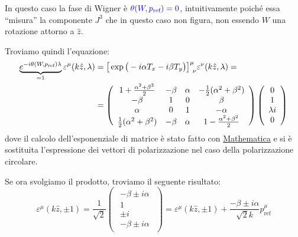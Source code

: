\documentclass[../main.tex]{subfiles}
\begin{document}
\begin{enumerate}
    In questo caso la fase di Wigner è $\textcolor{blue}{\theta (W, p_\text{ref})=0}$, intuitivamente poiché essa “misura” la componente $J^3$ che in questo caso non figura, non essendo $W$ una rotazione attorno a $\hat{z}$.

    Troviamo quindi l'equazione:
    \begin{align*}
        \underbrace{e^{-i\theta(W, p_\text{ref})\lambda}}_{\textcolor{blue}{=1}}\varepsilon^\mu(k\hat{z}, \lambda) &= \big[ \exp\big( -i\alpha T_x -i\beta T_y \big)\big]^{\mu}_{~\nu}\varepsilon^\nu(k\hat{z}, \lambda) =\\
        &=\begin{pmatrix}
            \begin{array}{cccc}
               1+\frac{\alpha^2+\beta^2}{2}  & -\beta  & \alpha  & -\frac{1}{2}(\alpha^2+\beta^2) \\
               -\beta  &  1  &  0  & \beta \\
               \alpha  &  0  &  1  & -\alpha \\
                \frac{1}{2}(\alpha^2+\beta^2) & -\beta & \alpha  &  1-\frac{\alpha^2+\beta^2}{2}
            \end{array}
        \end{pmatrix}
        \begin{pmatrix}
            \begin{array}{c}
                0 \\
                1 \\
                \lambda i\\
                0
            \end{array}
        \end{pmatrix}
    \end{align*}
    dove il calcolo dell'esponenziale di matrice è stato fatto con \href{https://www.wolfram.com/mathematica/}{Mathematica} e si è sostituita l'espressione dei vettori di polarizzazione nel caso della polarizzazione circolare.

    Se ora svolgiamo il prodotto, troviamo il seguente risultato:
    \begin{equation}
        \boxed{\varepsilon^\mu(k\hat{z}, \pm 1) = \frac{1}{\sqrt{2}}
        \begin{pmatrix}
            \begin{array}{c}
                -\beta\pm i\alpha \\
                1 \\
                \pm i\\
                -\beta\pm i\alpha
            \end{array}
        \end{pmatrix} = \varepsilon^\mu(k\hat{z}, \pm 1) + \frac{-\beta\pm i\alpha}{\sqrt{2}k}p^\mu_\text{ref}}
        \label{eq:inconsistency}
    \end{equation}
    

\end{enumerate}
\end{document}
